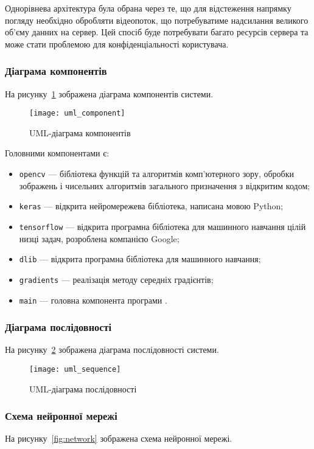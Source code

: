 Однорівнева архітектура була обрана через те, що для відстеження напрямку погляду необхідно обробляти відеопоток, що потребуватиме надсилання великого об'єму данних на сервер.
Цей спосіб буде потребувати багато ресурсів сервера та може стати проблемою для конфіденціальності користувача.  

\subsubsection{Діаграма компонентів}
На рисунку~\ref{fig:component} зображена діаграма компонентів системи.

\begin{figure}[H]
	\centering
	\texttt{[image: uml\_component]}
	\caption{UML-діаграма компонентів}
	\label{fig:component}
\end{figure} 

Головними компонентами є:
\begin{itemize}
	\item \texttt{opencv} --- бібліотека функцій та алгоритмів комп'ютерного зору, обробки зображень і чисельних алгоритмів загального призначення з відкритим кодом;
	\item \texttt{keras} --- відкрита нейромережева бібліотека, написана мовою Python;
	\item \texttt{tensorflow} --- відкрита програмна бібліотека для машинного навчання цілій низці задач, розроблена компанією Google;
	\item \texttt{dlib} --- відкрита програмна бібліотека для машинного навчання;
	\item \texttt{gradients} --- реалізація методу середніх градієнтів;
	\item \texttt{main} --- головна компонента програми .
\end{itemize}

\subsubsection{Діаграма послідовності}
На рисунку~\ref{fig:sequence} зображена діаграма послідовності системи.

\begin{figure}[H]
	\centering
	\texttt{[image: uml\_sequence]}
	\caption{UML-діаграма послідовності}
	\label{fig:sequence}
\end{figure} 

\subsubsection{Схема нейронної мережі}
На рисунку~\ref{fig:network} зображена схема нейронної мережі.

